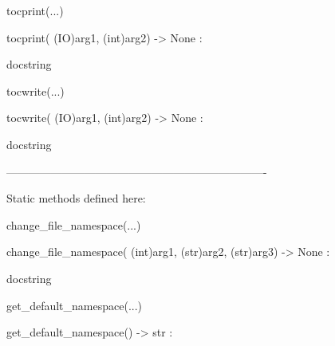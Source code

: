 \documentclass[letterpaper,10pt,english]{sphinxmanual}
\begin{document}
\begin{description}
\begin{description}
\begin{DUlineblock}{0em}
\begin{DUlineblock}{\DUlineblockindent}
\end{DUlineblock}
\item[] tocprint(...)
\item[]
\begin{DUlineblock}{\DUlineblockindent}
\item[] tocprint( (IO)arg1, (int)arg2) -\textgreater{} None :
\item[]
\begin{DUlineblock}{\DUlineblockindent}
\item[] docstring
\item[] 
\end{DUlineblock}
\end{DUlineblock}
\item[] tocwrite(...)
\item[]
\begin{DUlineblock}{\DUlineblockindent}
\item[] tocwrite( (IO)arg1, (int)arg2) -\textgreater{} None :
\item[]
\begin{DUlineblock}{\DUlineblockindent}
\item[] docstring
\item[] 
\end{DUlineblock}
\end{DUlineblock}
\item[] ----------------------------------------------------------------------
\item[] Static methods defined here:
\item[] 
\item[] change\_file\_namespace(...)
\item[]
\begin{DUlineblock}{\DUlineblockindent}
\item[] change\_file\_namespace( (int)arg1, (str)arg2, (str)arg3) -\textgreater{} None :
\item[]
\begin{DUlineblock}{\DUlineblockindent}
\item[] docstring
\item[] 
\end{DUlineblock}
\end{DUlineblock}
\item[] get\_default\_namespace(...)
\item[]
\begin{DUlineblock}{\DUlineblockindent}
\item[] get\_default\_namespace() -\textgreater{} str :
\item[]

\end{DUlineblock}
\end{DUlineblock}
\end{description}
\end{description}
\end{document}
